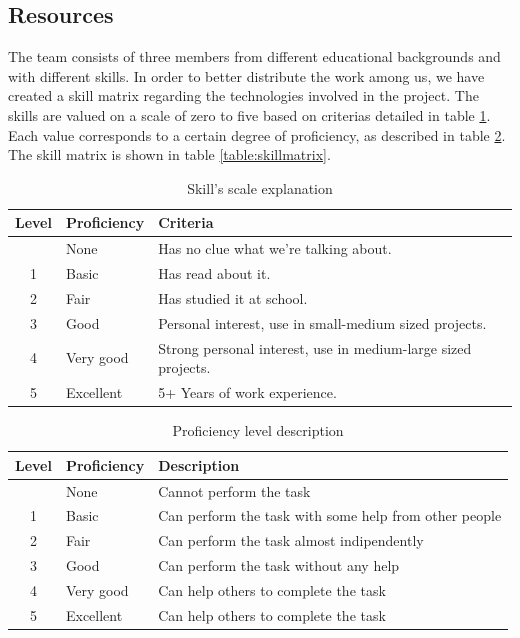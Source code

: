 
\subsection{Resources}
\label{section:resources}
The team consists of three members from different educational backgrounds and with different skills.
In order to better distribute the work among us, we have created a skill matrix regarding the technologies involved
in the project. The skills are valued on a scale of zero to five based on criterias detailed in table
\ref{table:skillscale}. Each value corresponds to a certain degree of proficiency, as described in table
\ref{table:proficiency}. The skill matrix is shown in table \ref{table:skillmatrix}.

\begin{table}[h]
\begin{center}
\begin{tabular}{ | c | l | l | }
  \hline
  Level & Proficiency & Criteria \\
  \hline\noalign{\smallskip}\hline
  0 & None		& Has no clue what we're talking about. \\
  1 & Basic		& Has read about it.\\
  2 & Fair		& Has studied it at school.\\
  3 & Good		& Personal interest, use in small-medium sized projects.\\
  4 & Very good	& Strong personal interest, use in medium-large sized projects. \\
  5 & Excellent	& 5+ Years of work experience. \\
  \hline
\end{tabular}
\end{center}
\caption{Skill's scale explanation}
\label{table:skillscale}
\end{table}

\begin{table}[h]
\begin{center}
\begin{tabular}{ | c | l | l | }
  \hline
  Level & Proficiency & Description \\
  \hline\noalign{\smallskip}\hline
  0 & None		  & Cannot perform the task \\
  1 & Basic     & Can perform the task with some help from other people \\
  2 & Fair		  & Can perform the task almost indipendently \\
  3 & Good		  & Can perform the task without any help \\
  4 & Very good	& Can help others to complete the task \\
  5 & Excellent	& Can help others to complete the task \\
  \hline
\end{tabular}
\end{center}
\caption{Proficiency level description}
\label{table:proficiency}
\end{table}

